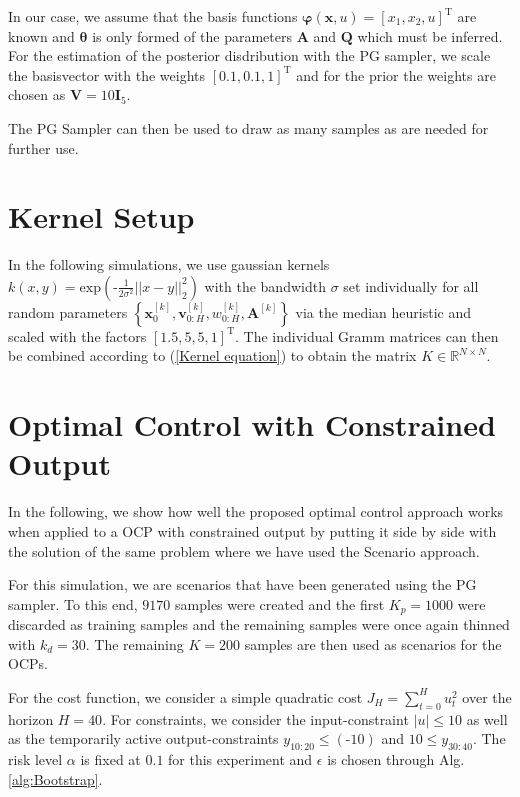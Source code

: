 In our case, we assume that the basis functions $\boldsymbol{\varphi} (\boldsymbol{x}, u) = \left[ x_1,  x_2,  u \right]^\text{T}$ are known and $\boldsymbol{\theta}$ is only formed of the parameters $\boldsymbol{A}$ and $\boldsymbol{Q}$ which must be inferred. For the estimation of the posterior disdribution with the PG sampler, we scale the basisvector with the weights $\left[ 0.1,  0.1,  1 \right]^\text{T}$ and for the prior the weights are chosen as $\boldsymbol{V} = 10 \boldsymbol{I}_5$.

The PG Sampler can then be used to draw as many samples as are needed for further use. 

\section{Kernel Setup} \label{Kernel setup}

In the following simulations, we use gaussian kernels $k(x,y) = \text{exp}\left(\text{-}\frac{1}{2\sigma^2} ||x - y||_2^2 \right)$ with the bandwidth $\sigma$ set individually for all random parameters $\left\{\boldsymbol{x}_0^{[k]}, \boldsymbol{v}_{0:H}^{[k]}, w_{0:H}^{[k]},  \boldsymbol{A}^{[k]}\right\}$ via the median heuristic \cite{Damien18} and scaled with the factors $\left[ 1.5, 5, 5, 1 \right]^\text{T}$. The individual Gramm matrices can then be combined according to (\ref{Kernel equation}) to obtain the matrix $K \in \mathbb{R}^{N \times N }$.




\section{Optimal Control with Constrained Output} \label{optimal control}

In the following, we show how well the proposed optimal control approach works when applied to a OCP with constrained output by putting it side by side with the solution of the same problem where we have used the Scenario approach.

For this simulation, we are scenarios that have been generated using the PG sampler. To this end, $9170$ samples were created and the first $K_p = 1000$ were discarded as training samples and the remaining samples were once again thinned with $k_d = 30$. The remaining $K = 200$ samples are then used as scenarios for the OCPs.

For the cost function, we consider a simple quadratic cost $J_H = \sum_{t = 0}^H u_t^2$ over the horizon $H = 40$. For constraints, we consider the input-constraint $\left| u \right| \leq 10$ as well as the temporarily active output-constraints $y_{10:20} \leq (\text{-} 10)$ and $10 \leq y_{30:40}$. The risk level $\alpha$ is fixed at $0.1$ for this experiment and $\epsilon$ is chosen through Alg. \ref{alg:Bootstrap}.

